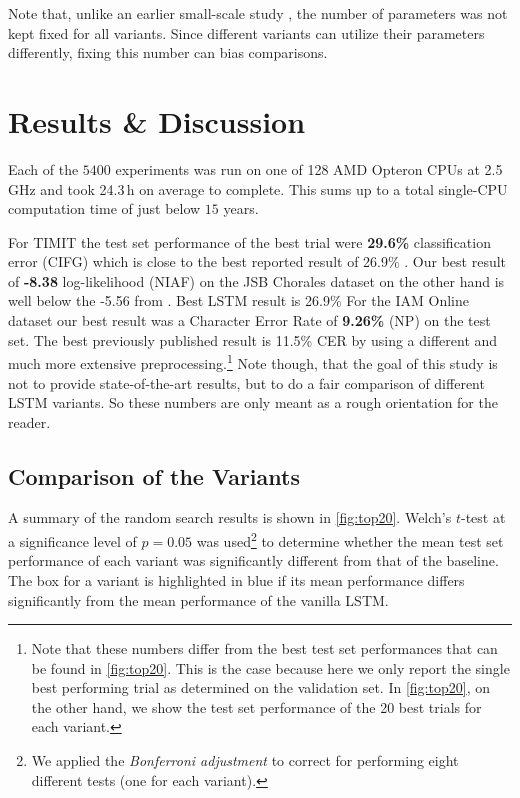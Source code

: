 Note that, unlike an earlier small-scale study \citep{Chung2014}, the number of parameters was not kept fixed for all variants. Since different variants can utilize their parameters differently, fixing this number can bias comparisons.

\section{Results \& Discussion}
\label{sec:results}

Each of the $5400$ experiments was run on one of 128 AMD Opteron CPUs at 2.5\,GHz and took 24.3\,h on average to complete. This sums up to a total single-CPU computation time of just below $15$ years. 

For TIMIT the test set performance of the best trial were \textbf{29.6\%} classification error (CIFG) which is close to the best reported result of 26.9\% \cite{Graves2005}. Our best result of \textbf{-8.38} log-likelihood (NIAF) on the JSB Chorales dataset on the other hand is well below the -5.56 from \citet{Boulanger-Lewandowski2012}. 
Best LSTM result is 26.9\% 
For the IAM Online dataset our best result was a Character Error Rate of \textbf{9.26\%} (NP) on the test set. The best previously published result is 11.5\% CER by \citet{Graves2008} using a different and much more extensive preprocessing.\footnote{Note that these numbers differ from the best test set performances that can be found in \autoref{fig:top20}. This is the case because here we only report the single best performing trial as determined on the validation set. In \autoref{fig:top20}, on the other hand, we show the test set performance of the 20 best trials for each variant.} Note though, that the goal of this study is not to provide state-of-the-art results, but to do a fair comparison of different LSTM variants. So these numbers are only meant as a rough orientation for the reader.

\subsection{Comparison of the Variants}
\label{sec:variant-comparison}

A summary of the random search results is shown in \autoref{fig:top20}. 
Welch's $t$-test at a significance level of $p=0.05$ was used\footnote{We applied the \emph{Bonferroni adjustment} to correct for performing eight different tests (one for each variant).} to determine whether the mean test set performance of each variant was significantly different from that of the baseline. The box for a variant is highlighted in blue if its mean performance differs significantly from the mean performance of the vanilla LSTM.

